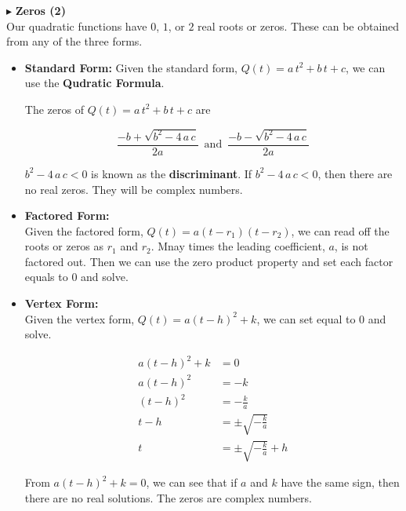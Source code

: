 \documentclass{ximera}
\begin{document}
$\blacktriangleright$ \textbf{\textcolor{red!10!blue!90!}{Zeros (2)}} \\ 
Our quadratic functions have $0$, $1$, or $2$ real roots or zeros.  These can be obtained from any of the three forms.


\begin{itemize}

\item \textbf{\textcolor{purple!85!blue}{Standard Form:}}  Given the standard form, $Q(t) = a \, t^2 + b \, t + c$, we can use the \textbf{Qudratic Formula}.

The zeros of $Q(t) = a \, t^2 + b \, t + c$ are

\[   \frac{-b + \sqrt{b^2 - 4 \, a \, c}}{2a}      \, \text{ and } \,       \frac{-b - \sqrt{b^2 - 4 \, a \, c}}{2a}    \]



$b^2 - 4 \, a \, c < 0$ is known as the \textbf{discriminant}. If $b^2 - 4 \, a \, c < 0$, then there are no real zeros.  They will be complex numbers.


\item \textbf{\textcolor{purple!85!blue}{Factored Form:}} \\ 
Given the factored form, $Q(t) = a (t - r_1)(t - r_2)$, we can read off the roots or zeros as $r_1$ and $r_2$. Mnay times the leading coefficient, $a$, is not factored out.  Then we can use the zero product property and set each factor equals to $0$ and solve.






\item  \textbf{\textcolor{purple!85!blue}{Vertex Form:}} \\
Given the vertex form, $Q(t) = a (t - h)^2 + k$, we can set equal to $0$ and solve.



\begin{align*}
a (t - h)^2 + k    & = 0  \\
a (t - h)^2        & = -k  \\
(t - h)^2        & = -\frac{k}{a}  \\
t - h        & = \pm \sqrt{-\frac{k}{a}}  \\
t        & = \pm \sqrt{-\frac{k}{a}}  + h
\end{align*}

From $a (t - h)^2 + k  = 0$, we can see that if $a$ and $k$ have the same sign, then there are no real solutions.  The zeros are complex numbers.



\end{itemize}
\end{document}
